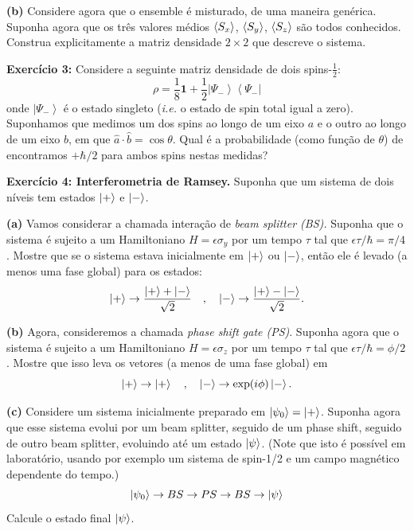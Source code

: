 \documentclass[12pt]{article}
\begin{document}
\medskip

\textbf{(b)} Considere agora que o ensemble é misturado, de uma maneira genérica. Suponha agora que os três valores médios
$\ev{S_x}$, $\ev{S_y}$, $\ev{S_z}$ são todos conhecidos. Construa explicitamente a matriz densidade $2\times2$ que descreve o sistema.

\vspace*{1em}

\textbf{Exercício 3:} Considere a seguinte matriz densidade de dois spins-$\frac{1}{2}$:
\[
\rho=\frac{1}{8} \mathbf{1}+\frac{1}{2}\left|\Psi_{-}\right\rangle\left\langle\Psi_{-}\right|
\]
onde \(\left|\Psi_{-}\right\rangle\) é o estado singleto (\textit{i.e.} o estado de spin total igual a zero). Suponhamos que
medimos um dos spins ao longo de um eixo \(a\) e o outro ao longo de um eixo \(b\), em que
\(\hat{a} \cdot \hat{b}=\cos \theta\). Qual é a probabilidade (como função de \(\theta\)) de encontramos \(+\hbar / 2\) para ambos
spins nestas medidas?

\textbf{Exercício 4: Interferometria de Ramsey.} Suponha que um sistema de dois níveis tem estados $\ket{+}$ e $\ket{-}$.

\textbf{(a)} Vamos considerar a chamada interação de \textit{beam splitter (BS).} Suponha que o sistema é sujeito a um Hamiltoniano $H = \epsilon \sigma_y$ por um tempo $\tau$ tal que $\epsilon \tau /\hbar = \pi/4$.
Mostre que se o sistema estava inicialmente em $\ket{+}$ ou $\ket{-}$, então ele é levado (a menos uma fase global) para os estados:
\[
\ket{+} \to \frac{\ket{+} + \ket{-}}{\sqrt{2}}
\quad,\quad
\ket{-} \to \frac{\ket{+} - \ket{-}}{\sqrt{2}}.
\]

\textbf{(b)} Agora, consideremos a chamada \textit{phase shift gate (PS)}. Suponha agora que o sistema é sujeito a um Hamiltoniano $H = \epsilon \sigma_z$ por um tempo $\tau$ tal que $\epsilon \tau /\hbar = \phi/2$. Mostre que isso leva os vetores (a menos de uma fase global) em
\[
\ket{+} \to \ket{+}\quad,\quad\ket{-} \to \exp(i\phi)\ket{-}.
\]

\textbf{(c)} Considere um sistema inicialmente preparado em $\ket{\psi_0} = \ket{+}$. Suponha agora que esse sistema evolui por um beam splitter, seguido de um phase shift, seguido de outro beam splitter, evoluindo até um estado $\ket{\psi}$. (Note que isto é possível em laboratório, usando por exemplo um sistema de spin-1/2 e um campo magnético dependente do tempo.)
\[
\ket{\psi_0} \to BS \to PS \to BS \to \ket{\psi}
\]
Calcule o estado final $\ket{\psi}$. 
\end{document}
